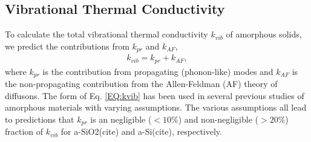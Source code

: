 \documentclass[aps,prb,onecolumn,preprint,superscriptaddress,footinbib,amsmath,amssymb,floatfix]{revtex4}
\begin{document}
\subsection{\label{S:Theory:Thermal}Vibrational Thermal Conductivity}

To calculate the total vibrational thermal conductivity $k_{vib}$ 
of amorphous solids, we predict 
the contributions from $k_{pr}$ and $k_{AF}$, 
\begin{equation}\label{EQ:kvib}
\begin{split}
k_{vib} = k_{pr} + k_{AF},
\end{split}
\end{equation}
where $k_{pr}$\cite{ashcroft_solid_1976,dove_introduction_1993,
ziman_electrons_2001} is the contribution from 
propagating (phonon-like) modes and $k_{AF}$ is the non-propagating 
contribution 
from the Allen-Feldman (AF) theory of diffusons.
\cite{feldman_thermal_1993} The form of Eq. \eqref{EQ:kvib}
has been used in 
several previous studies of amorphous materials with varying 
assumptions.\cite{feldman_thermal_1993,cahill_thermal_1994,
liu_high_2009,yang_anomalously_2010,feldman_numerical_1999,
baldi_thermal_2008,he_heat_2011} 
The various 
assumptions all lead to predictions that $k_{pr}$ is an negligible 
($< 10\%$) 
and non-negligible ($> 20\%$) fraction of $k_{vib}$ 
for 
a-SiO2(cite) and 
a-Si(cite), respectively.  
\end{document}
